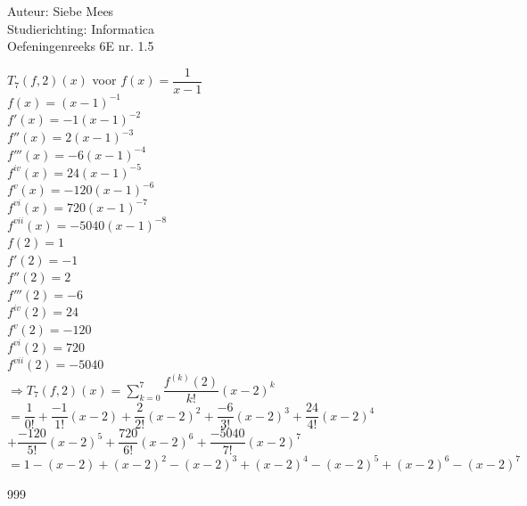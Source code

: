 \documentclass[a4paper]{article}
\begin{document}
  
\noindent \large Auteur: Siebe Mees \\
\noindent \large Studierichting: Informatica\\
\noindent \large Oefeningenreeks 6E nr. 1.5\\

\medskip

\normalsize

$T_7\left(f,2\right)(x)$ voor $f(x)=\dfrac{1}{x-1}$\\

$f(x)=(x-1)^{-1}$\\

$f'(x)=-1(x-1)^{-2}$\\

$f''(x)=2(x-1)^{-3}$\\

$f'''(x)=-6(x-1)^{-4}$\\

$f^{iv}(x)=24(x-1)^{-5}$\\

$f^{v}(x)=-120(x-1)^{-6}$\\

$f^{vi}(x)=720(x-1)^{-7}$\\

$f^{vii}(x)=-5040(x-1)^{-8}$\\

$f(2)=1$\\

$f'(2)=-1$\\

$f''(2)=2$\\

$f'''(2)=-6$\\

$f^{iv}(2)=24$\\

$f^{v}(2)=-120$\\

$f^{vi}(2)=720$\\

$f^{vii}(2)=-5040$\\

$\Rightarrow T_7\left(f,2\right)(x)=\displaystyle\sum_{k=0}^{7}\dfrac{f^{(k)}(2)}{k!}(x-2)^k$\\

$=\dfrac{1}{0!}+\dfrac{-1}{1!}(x-2)+\dfrac{2}{2!}(x-2)^2+\dfrac{-6}{3!}(x-2)^3+\dfrac{24}{4!}(x-2)^4$\\

$+\dfrac{-120}{5!}(x-2)^5+\dfrac{720}{6!}(x-2)^6+\dfrac{-5040}{7!}(x-2)^7$\\

$=1-(x-2)+(x-2)^2-(x-2)^3+(x-2)^4-(x-2)^5+(x-2)^6-(x-2)^7$\\

\begin{thebibliography}{999}
\end{thebibliography}
\end{document}
